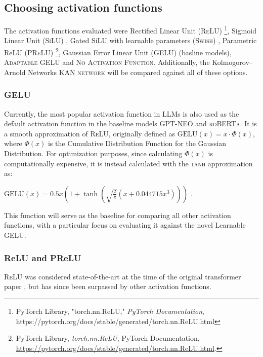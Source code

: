 \subsection{Choosing activation functions}
The activation functions evaluated were Rectified Linear Unit (\textsc{ReLU}) \footnote{PyTorch Library, "torch.nn.ReLU," \textit{PyTorch Documentation}, https://pytorch.org/docs/stable/generated/torch.nn.ReLU.html}, Sigmoid Linear Unit (\textsc{SiLU}) \cite{Hendrycks2023}, Gated SiLU with learnable parameters (\textsc{Swish}) \cite{eger_is_2019}, Parametric ReLU (\textsc{PReLU}) \footnote{PyTorch Library, \textit{torch.nn.ReLU}, PyTorch Documentation, \url{https://pytorch.org/docs/stable/generated/torch.nn.ReLU.html}.}, Gaussian Error Linear Unit (\textsc{GELU}) (basline models), \textsc{Adaptable GELU} and \textsc{No Activation Function}. Additionally, the Kolmogorov–Arnold Networks \textsc{KAN network} \cite{Liu2024} will be compared against all of these options.

\subsubsection{GELU}
Currently, the most popular activation function in LLMs is also used as the default activation function in the baseline models \textsc{GPT-NEO} and \textsc{roBERTa}. It is a smooth approximation of \textsc{ReLU}, originally defined as \(\text{GELU}(x) = x \cdot \Phi(x)\), where \(\Phi(x)\)
is the Cumulative Distribution Function for the Gaussian Distribution. For optimization purposes, since calculating \(\Phi(x)\) is computationally expensive, it is instead calculated with the \textsc{tanh} approximation as:

\(\text{GELU}(x) = 0.5x \left(1 + \tanh\left(\sqrt{\frac{2}{\pi}} \left(x + 0.044715x^3\right)\right)\right)\) \cite{Hendrycks2023}. 

This function will serve as the baseline for comparing all other activation functions, with a particular focus on evaluating it against the novel Learnable GELU.

\subsubsection{ReLU and PReLU}
\textsc{ReLU} was considered state-of-the-art at the time of the original transformer paper \cite{Vaswani2017}, but has since been surpassed by other activation functions.

